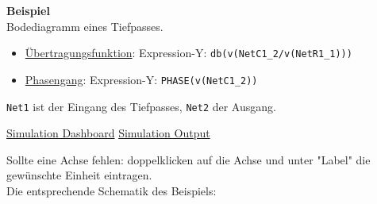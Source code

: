 \begin{itemize}
    \textbf{Beispiel} \\
    Bodediagramm eines Tiefpasses.

    \begin{itemize}
        \item \underline{Übertragungsfunktion}: Expression-Y: \verb|db(v(NetC1_2/v(NetR1_1)))|
        \item \underline{Phasengang}: Expression-Y: \verb|PHASE(v(NetC1_2))|
    \end{itemize}
    \verb|Net1| ist der Eingang des Tiefpasses, \verb|Net2| der Ausgang.

    \underline{Simulation Dashboard}
    \underline{Simulation Output}

    Sollte eine Achse fehlen: doppelklicken auf die Achse und unter "Label" die gewünschte Einheit eintragen. \\

    Die entsprechende Schematik des Beispiels:
\end{itemize}

